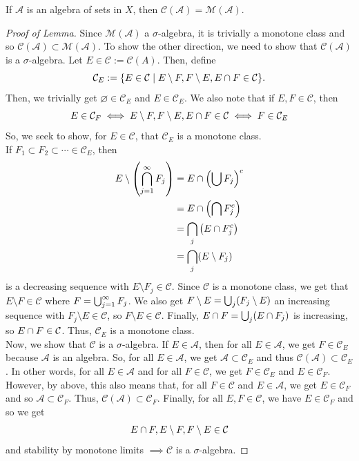 \documentclass[11pt,leqno,oneside]{amsbook}
\numberwithin{thm}{section}
\renewcommand{\A}{\mathcal{A}} %
\newcommand{\M}{\mathcal{M}} %
\newcommand{\cC}{\mathcal{C}} %
\newcommand{\s}{$\sigma$-} %
\renewcommand{\emptyset}{\varnothing}
\begin{document}
\begin{lem}
  If \(\A\) is an algebra of sets in \(X\), then \(\cC(\A) = \M(\A)\).
\end{lem}
\begin{proof}[Proof of Lemma]
  Since \(\M(\A)\) a \s algebra, it is trivially a monotone class and
  so \(\cC(\A) \subset \M(\A)\). To show the other direction, we need
  to show that \(\cC(\A)\) is a \s algebra. Let \(E \in \cC :=
  \cC(A)\). Then, define \[
    \cC_E := \{E \in \cC \st E \setminus F, F \setminus E, E
    \intersect F \in \cC\}.
  \]
  Then, we trivially get \(\emptyset \in \cC_E\) and \(E \in
  \cC_E\). We also note that if \(E,F \in \cC\), then \[
    E \in \cC_F \iff E \setminus F, F \setminus E, E \intersect F \in
    \cC \iff F \in \cC_E
  \]
  So, we seek to show, for \(E \in \cC\), that \(\cC_E\) is a monotone
  class. \\

  If \(F_1 \subset F_2 \subset \cdots \in \cC_E\), then
  \begin{align*}
    E \setminus \left( \bigcap_{j=1}^\infty F_j \right)
    & = E \cap \left( \bigcup F_j \right)^c \\
    & = E \cap \left( \bigcap F_j^c \right) \\
    & = \bigcap_j \left( E \cap F_j^c \right) \\
    & = \bigcap_j (E \setminus F_j)
  \end{align*}
  is a decreasing sequence with \(E \setminus F_j \in \cC\). Since
  \(\cC\) is a monotone class, we get that \(E \setminus F \in \cC\)
  where \(F = \bigcup_{j=1}^\infty F_j\). We also get \(F \setminus E =
  \bigcup_j (F_j \setminus E)\) an increasing sequence with \(F_j
  \setminus E \in \cC\), so \(F \setminus E \in \cC\). Finally, \(E
  \cap F = \bigcup_j (E \cap F_j)\) is increasing, so \(E
  \intersect F \in \cC\). Thus, \(\cC_E\) is a monotone class. \\

  Now, we show that \(\cC\) is a \s algebra. If \(E \in \A\), then
  for all \(E \in \A\), we get \(F \in 
  \cC_E\) because \(\A\) is an algebra. So, for all \(E \in \A\), we
  get \(\A \subset \cC_E\) and thus \(\cC(\A) \subset \cC_E\). In
  other words, for all \(E \in \A\) and for all \(F \in \cC\), we get
  \(F \in \cC_E\) and \(E \in \cC_F\). However, by above, this also
  means that, for all \(F \in \cC\) and \(E \in \A\), we get \(E \in
  \cC_F\) and so \(\A \subset \cC_F\). Thus, \(\cC(\A) \subset
  \cC_F\). Finally, for all \(E,F \in \cC\), we have \(E \in \cC_F\)
  and so we get \[
    E \intersect F, E \setminus F, F \setminus E \in \cC
  \]
  and stability by monotone limits \(\implies \cC\) is a \s algebra.
\end{proof}
\end{document}
